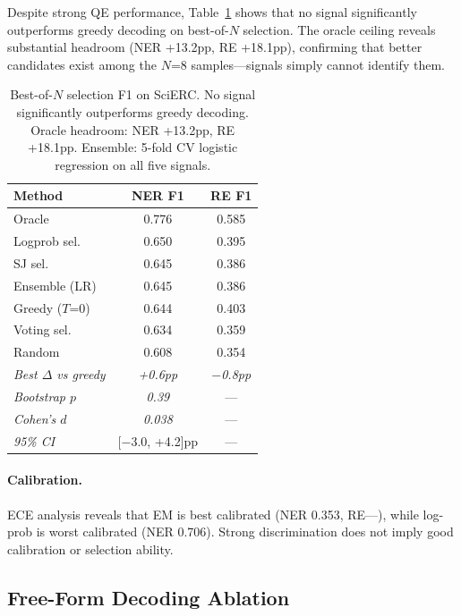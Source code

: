 \documentclass[11pt,a4paper]{article}
\begin{document}
Despite strong QE performance, Table~\ref{tab:selection_main} shows that no signal significantly outperforms greedy decoding on best-of-$N$ selection. The oracle ceiling reveals substantial headroom (NER +13.2pp, RE +18.1pp), confirming that better candidates exist among the $N$=8 samples---signals simply cannot identify them.

\begin{table}[t]
\centering
\small
\begin{tabular}{l cc}
\toprule
\textbf{Method} & \textbf{NER F1} & \textbf{RE F1} \\
\midrule
Oracle          & 0.776 & 0.585 \\
\midrule
Logprob sel.    & 0.650 & 0.395 \\
SJ sel.         & 0.645 & 0.386 \\
Ensemble (LR)   & 0.645 & 0.386 \\
Greedy ($T$=0)  & 0.644 & 0.403 \\
Voting sel.     & 0.634 & 0.359 \\
Random          & 0.608 & 0.354 \\
\midrule
\textit{Best $\Delta$ vs greedy} & \textit{+0.6pp} & \textit{$-$0.8pp} \\
\textit{Bootstrap $p$} & \textit{0.39} & --- \\
\textit{Cohen's $d$} & \textit{0.038} & --- \\
\textit{95\% CI} & [$-$3.0, +4.2]pp & --- \\
\bottomrule
\end{tabular}
\caption{Best-of-$N$ selection F1 on SciERC. No signal significantly outperforms greedy decoding. Oracle headroom: NER +13.2pp, RE +18.1pp. Ensemble: 5-fold CV logistic regression on all five signals.}
\label{tab:selection_main}
\end{table}

\paragraph{Calibration.} ECE analysis reveals that EM is best calibrated (NER 0.353, RE---), while log-prob is worst calibrated (NER 0.706). Strong discrimination does not imply good calibration or selection ability.

\subsection{Free-Form Decoding Ablation}
\label{sec:freeform}
\end{document}
